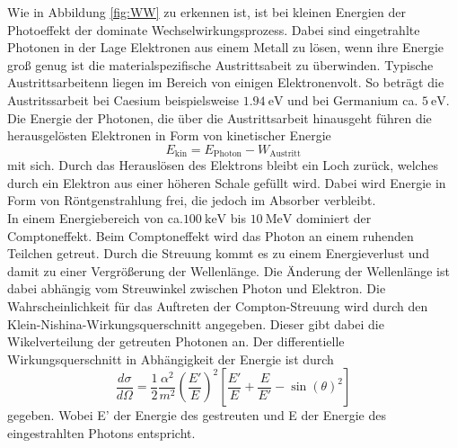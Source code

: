 Wie in Abbildung \ref{fig:WW} zu erkennen ist, ist bei kleinen Energien der Photoeffekt der
dominate Wechselwirkungsprozess. Dabei sind eingetrahlte Photonen in der Lage Elektronen aus
einem Metall zu lösen, wenn ihre Energie groß genug ist die materialspezifische Austrittsabeit
zu überwinden. Typische Austrittsarbeitenn liegen im Bereich von einigen Elektronenvolt. So beträgt
die Austritssarbeit bei Caesium beispielsweise $\SI{1,94}{\electronvolt}$ und bei Germanium
ca. $\SI{5}{\electronvolt}$. Die Energie der Photonen, die über die Austrittsarbeit hinausgeht
führen die herausgelösten Elektronen in Form von kinetischer Energie
\begin{equation}
    E_\text{kin} = E_\text{Photon} - W_\text{Austritt}
\end{equation}
mit sich. Durch das Herauslösen des Elektrons bleibt ein Loch zurück, welches durch ein Elektron
aus einer höheren Schale gefüllt wird. Dabei wird Energie in Form von Röntgenstrahlung frei, die
jedoch im Absorber verbleibt. \\
In einem Energiebereich von ca.$\SI{100}{\kilo\electronvolt}$ bis $\SI{10}{\mega\electronvolt}$ dominiert
der Comptoneffekt. Beim Comptoneffekt wird das Photon an einem ruhenden Teilchen getreut.
Durch die Streuung kommt es zu einem Energieverlust und damit zu einer Vergrößerung der
Wellenlänge. Die Änderung der Wellenlänge ist dabei abhängig vom Streuwinkel zwischen Photon und
Elektron. Die Wahrscheinlichkeit für das Auftreten der Compton-Streuung wird durch den
Klein-Nishina-Wirkungsquerschnitt angegeben. Dieser gibt dabei die Wikelverteilung der getreuten
Photonen an.
Der differentielle Wirkungsquerschnitt in Abhängigkeit der Energie ist durch
\begin{equation}
    \frac{d\sigma}{d\Omega} = \frac{1}{2} \frac{\alpha^2}{m^2} \left(\frac{E'}{E}\right)^2 \left[\frac{E'}{E}+\frac{E}{E'}-\sin(\theta)^2\right]
\end{equation} \noindent
gegeben. Wobei E' der Energie des gestreuten und E der Energie des eingestrahlten Photons entspricht.
